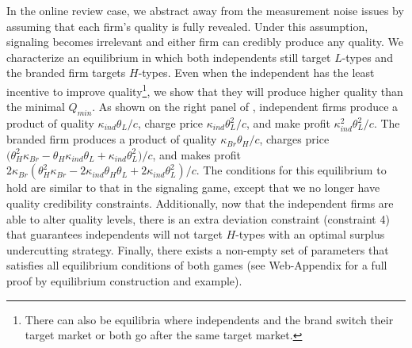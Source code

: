 \documentclass[12pt, leqno]{article}
\begin{document}
In the online review case, we abstract away from the measurement noise issues by assuming that each firm’s quality is fully revealed. Under this assumption, signaling becomes irrelevant and either firm can credibly produce any quality. We characterize an equilibrium in which both independents still target $L$-types and the branded firm targets $H$-types. Even when the independent has the least incentive to improve quality\footnote{There can also be equilibria where independents and the brand switch their target market or both go after the same target market.}, we show that they will produce higher quality than the minimal $Q_{min}$. As shown on the right panel of , independent firms produce a product of quality $\kappa_{ind}\theta_L/c$, charge price $\kappa_{ind}\theta_L^2/c$, and make profit $\kappa_{ind}^2\theta_L^2/c$. The branded firm produces a product of quality $\kappa_{Br}\theta_H/c$, charges price $\big(\theta_H^2 \kappa_{Br}-\theta_H \kappa_{ind} \theta_L+\kappa_{ind} \theta_L^2\big)/c$, and makes profit $2 \kappa_{Br} (\theta_H^2 \kappa_{Br}-2 \kappa_{ind} \theta_H \theta_L+2 \kappa_{ind} \theta_L^2)/c$. The conditions for this equilibrium to hold are similar to that in the signaling game, except that we no longer have quality credibility constraints. Additionally, now that the independent firms are able to alter quality levels, there is an extra deviation constraint (constraint 4) that guarantees independents will not target $H$-types with an optimal surplus undercutting strategy. Finally, there exists a non-empty set of parameters that satisfies all equilibrium conditions of both games (see Web-Appendix for a full proof by equilibrium construction and example).
\end{document}
